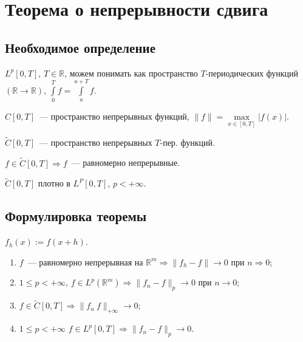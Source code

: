 \documentclass{article}
\begin{document}
    \newpage
    
    \section{Теорема о непрерывности сдвига}
    
        \subsection{Необходимое определение}
        
            $L^p [0, T]$, $T \in \mathbb{R}$, можем понимать как пространство $T$-периодических функций $\left( \mathbb{R} \rightarrow \mathbb{R} \right)$, $\int\limits^T_0 f = \int\limits^{a + T}_a f$.
    
            $C [0, T]$~--- пространство непрерывных функций, $\| f \| = \max\limits_{x \in [0, T]} | f(x) |$.
    
            $\widetilde{C} [0, T]$~--- пространство непрерывных $T$-пер. функций.
        
            $f \in \widetilde{C} [0, T] \Rightarrow f$~--- равномерно непрерывные.
    
            $\widetilde{C} [0, T]$ плотно в $L^P [0, T]$, $p < +\infty$.
    
        \subsection{Формулировка теоремы}
        
            $f_h(x) := f(x + h)$.
        
            \begin{enumerate}
        
                \item $f$~--- равномерно непрерывная на $\mathbb{R}^m \Rightarrow \| f_h - f \| \rightarrow 0$ при $n \Rightarrow 0$;
            
                \item $1 \leqslant p < +\infty$, $f \in L^p \left( \mathbb{R}^m \right) \Rightarrow \| f_n - f \|_p \rightarrow 0$ при $n \rightarrow 0$;
            
                \item $f \in \widetilde{C} [0, T] \Rightarrow \| f_n \ f \|_{+\infty} \rightarrow 0$;
            
                \item $1 \leqslant p < +\infty$ $f \in L^p [0, T] \Rightarrow \| f_n - f \|_p \rightarrow 0$.
            
            \end{enumerate}
        
\end{document}
